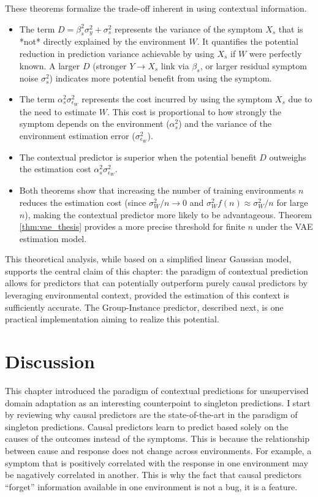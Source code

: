 \documentclass[../thesis.tex]{subfiles}
\begin{document}
These theorems formalize the trade-off inherent in using contextual information.
\begin{itemize}
    \item The term $D = \beta_s^2 \sigma_y^2 + \sigma_s^2$ represents the variance of the symptom $X_s$ that is *not* directly explained by the environment $W$. It quantifies the potential reduction in prediction variance achievable by using $X_s$ if $W$ were perfectly known. A larger $D$ (stronger $Y \to X_s$ link via $\beta_s$, or larger residual symptom noise $\sigma_s^2$) indicates more potential benefit from using the symptom.
    \item The term $\alpha_s^2 \sigma_{\epsilon_W}^2$ represents the cost incurred by using the symptom $X_s$ due to the need to estimate $W$. This cost is proportional to how strongly the symptom depends on the environment ($\alpha_s^2$) and the variance of the environment estimation error ($\sigma_{\epsilon_W}^2$).
    \item The contextual predictor is superior when the potential benefit $D$ outweighs the estimation cost $\alpha_s^2 \sigma_{\epsilon_W}^2$.
    \item Both theorems show that increasing the number of training environments $n$ reduces the estimation cost (since $\sigma_W^2/n \to 0$ and $\sigma_W^2 f(n) \approx \sigma_W^2/n$ for large $n$), making the contextual predictor more likely to be advantageous. Theorem \ref{thm:vae_thesis} provides a more precise threshold for finite $n$ under the VAE estimation model.
\end{itemize}
This theoretical analysis, while based on a simplified linear Gaussian model, supports the central claim of this chapter: the paradigm of contextual prediction allows for predictors that can potentially outperform purely causal predictors by leveraging environmental context, provided the estimation of this context is sufficiently accurate. The Group-Instance predictor, described next, is one practical implementation aiming to realize this potential.

\section{Discussion}

This chapter introduced the paradigm of contextual predictions for unsupervised domain adaptation as an interesting counterpoint to singleton predictions. I start by reviewing why causal predictors are the state-of-the-art in the paradigm of singleton predictions. Causal predictors learn to predict based solely on the causes of the outcomes instead of the symptoms. This is because the relationship between cause and response does not change across environments. For example, a symptom that is positively correlated with the response in one environment may be nagatively correlated in another. This is why the fact that causal predictors ``forget'' information available in one environment is not a bug, it is a feature. 
\end{document}
